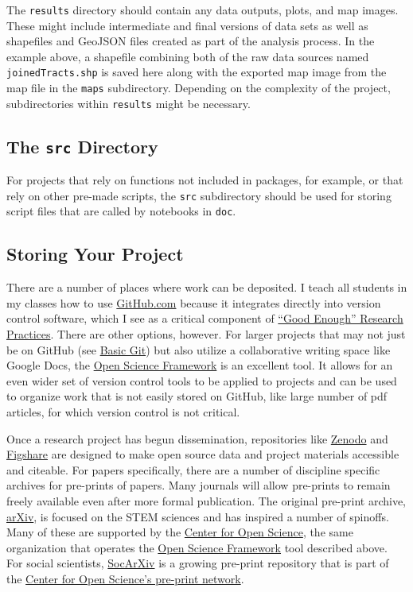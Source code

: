\documentclass[]{book}
\theoremstyle{definition}
\theoremstyle{definition}
\theoremstyle{definition}
\theoremstyle{remark}
\begin{document}
The \texttt{results} directory should contain any data outputs, plots,
and map images. These might include intermediate and final versions of
data sets as well as shapefiles and GeoJSON files created as part of the
analysis process. In the example above, a shapefile combining both of
the raw data sources named \texttt{joinedTracts.shp} is saved here along
with the exported map image from the map file in the \texttt{maps}
subdirectory. Depending on the complexity of the project, subdirectories
within \texttt{results} might be necessary.

\subsection{\texorpdfstring{The \texttt{src}
Directory}{The src Directory}}\label{the-src-directory}

For projects that rely on functions not included in packages, for
example, or that rely on other pre-made scripts, the \texttt{src}
subdirectory should be used for storing script files that are called by
notebooks in \texttt{doc}.

\subsection{Storing Your Project}\label{storing-your-project}

There are a number of places where work can be deposited. I teach all
students in my classes how to use \href{https://github.com}{GitHub.com}
because it integrates directly into version control software, which I
see as a critical component of
\protect\hyperlink{good-enough-research-practices}{``Good Enough''
Research Practices}. There are other options, however. For larger
projects that may not just be on GitHub (see
\protect\hyperlink{basic-git}{Basic Git}) but also utilize a
collaborative writing space like Google Docs, the
\href{https://osf.io}{Open Science Framework} is an excellent tool. It
allows for an even wider set of version control tools to be applied to
projects and can be used to organize work that is not easily stored on
GitHub, like large number of pdf articles, for which version control is
not critical.

Once a research project has begun dissemination, repositories like
\href{https://zenodo.org}{Zenodo} and
\href{https://figshare.com}{Figshare} are designed to make open source
data and project materials accessible and citeable. For papers
specifically, there are a number of discipline specific archives for
pre-prints of papers. Many journals will allow pre-prints to remain
freely available even after more formal publication. The original
pre-print archive, \href{https://arxiv.org}{arXiv}, is focused on the
STEM sciences and has inspired a number of spinoffs. Many of these are
supported by the \href{https://cos.io}{Center for Open Science}, the
same organization that operates the \href{https://osf.io}{Open Science
Framework} tool described above. For social scientists,
\href{https://socopen.org/welcome/}{SocArXiv} is a growing pre-print
repository that is part of the
\href{https://osf.io/preprints/socarxiv}{Center for Open Science's
pre-print network}.
\end{document}
